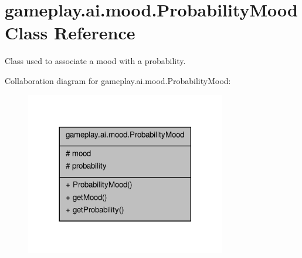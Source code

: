 \hypertarget{classgameplay_1_1ai_1_1mood_1_1_probability_mood}{\section{gameplay.\-ai.\-mood.\-Probability\-Mood Class Reference}
\label{classgameplay_1_1ai_1_1mood_1_1_probability_mood}
}


Class used to associate a mood with a probability.  




Collaboration diagram for gameplay.\-ai.\-mood.\-Probability\-Mood\-:\nopagebreak
\begin{figure}[H]
\begin{center}
\leavevmode
\includegraphics[width=248pt]{classgameplay_1_1ai_1_1mood_1_1_probability_mood__coll__graph}
\end{center}
\end{figure}
